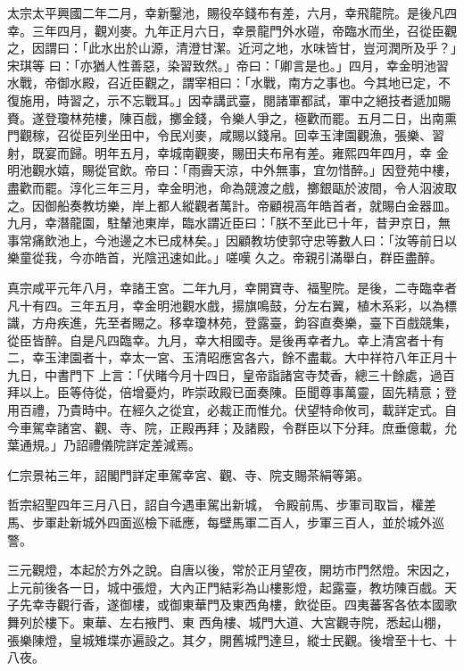 \begin{pinyinscope}
 太宗太平興國二年二月，幸新鑿池，賜役卒錢布有差，六月，幸飛龍院。是後凡四幸。三年四月，觀刈麥。九年正月六日，幸景龍門外水磑，帝臨水而坐，召從臣觀之，因謂曰：「此水出於山源，清澄甘潔。近河之地，水味皆甘，豈河潤所及乎？」宋琪等
 曰：「亦猶人性善惡，染習致然。」帝曰：「卿言是也。」四月，幸金明池習水戰，帝御水殿，召近臣觀之，謂宰相曰：「水戰，南方之事也。今其地已定，不復施用，時習之，示不忘戰耳。」因幸講武臺，閱諸軍都試，軍中之絕技者遞加賜賚。遂登瓊林苑樓，陳百戲，擲金錢，令樂人爭之，極歡而罷。五月二日，出南熏門觀稼，召從臣列坐田中，令民刈麥，咸賜以錢帛。回幸玉津園觀漁，張樂、習射，既宴而歸。明年五月，幸城南觀麥，賜田夫布帛有差。雍熙四年四月，幸
 金明池觀水嬉，賜從官飲。帝曰：「雨霽天涼，中外無事，宜勿惜醉。」因登苑中樓，盡歡而罷。淳化三年三月，幸金明池，命為競渡之戲，擲銀甌於波間，令人泅波取之。因御船奏教坊樂，岸上都人縱觀者萬計。帝顧視高年皓首者，就賜白金器皿。九月，幸潛龍園，駐輦池東岸，臨水謂近臣曰：「朕不至此已十年，昔尹京日，無事常痛飲池上，今池邊之木已成林矣。」因顧教坊使郭守忠等數人曰：「汝等前日以樂童從我，今亦皓首，光陰迅速如此。」嗟嘆
 久之。帝親引滿舉白，群臣盡醉。



 真宗咸平元年八月，幸諸王宮。二年九月，幸開寶寺、福聖院。是後，二寺臨幸者凡十有四。三年五月，幸金明池觀水戲，揚旗鳴鼓，分左右翼，植木系彩，以為標識，方舟疾進，先至者賜之。移幸瓊林苑，登露臺，鈞容直奏樂，臺下百戲競集，從臣皆醉。自是凡四臨幸。九月，幸大相國寺。是後再幸者九。幸上清宮者十有二，幸玉津園者十，幸太一宮、玉清昭應宮各六，餘不盡載。大中祥符八年正月十九日，中書門下
 上言：「伏睹今月十四日，皇帝詣諸宮寺焚香，總三十餘處，過百拜以上。臣等侍從，倍增憂灼，昨崇政殿已面奏陳。臣聞尊事萬靈，固先精意；登用百禮，乃貴時中。在經久之從宜，必裁正而惟允。伏望特命攸司，載詳定式。自今車駕幸諸宮、觀、寺、院，正殿再拜；及諸殿，令群臣以下分拜。庶垂億載，允葉通規。」乃詔禮儀院詳定差減焉。



 仁宗景祐三年，詔閣門詳定車駕幸宮、觀、寺、院支賜茶絹等第。



 哲宗紹聖四年三月八日，詔自今遇車駕出新城，
 令殿前馬、步軍司取旨，權差馬、步軍赴新城外四面巡檢下祗應，每壁馬軍二百人，步軍三百人，並於城外巡警。



 三元觀燈，本起於方外之說。自唐以後，常於正月望夜，開坊市門然燈。宋因之，上元前後各一日，城中張燈，大內正門結彩為山樓影燈，起露臺，教坊陳百戲。天子先幸寺觀行香，遂御樓，或御東華門及東西角樓，飲從臣。四夷蕃客各依本國歌舞列於樓下。東華、左右掖門、東
 西角樓、城門大道、大宮觀寺院，悉起山棚，張樂陳燈，皇城雉堞亦遍設之。其夕，開舊城門達旦，縱士民觀。後增至十七、十八夜。




\end{pinyinscope}

